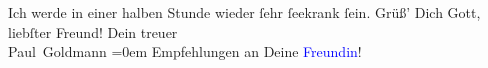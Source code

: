            \pstart
           Ich werde in einer halben Stunde wieder ſehr ſeekrank ſein.\pend
           \pstart
           Grüß’ Dich Gott, liebſter Freund!\pend
           \pstart
           Dein treuer {\\[\baselineskip]}\spacefill\mbox{Paul Goldmann}\pend
           \leftskip=0em{}\pstart
           \noindent{}Empfehlungen an Deine \textcolor{blue}{Freundin}{}!\pend
           \endnumbering{}\begin{anhang}\end{anhang}
      